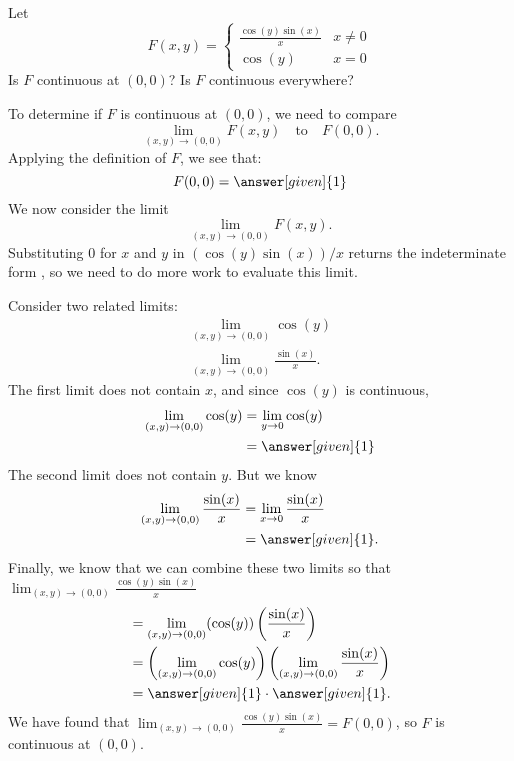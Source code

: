\documentclass{ximera}
\newcommand{\point}[1]{\left(#1\right)} %
\begin{document}
\begin{example}
  Let
  \[
  F(x,y) = \begin{cases}
    \frac{\cos(y)\sin(x)}{x} & x\neq 0 \\
    \cos(y) & x=0
  \end{cases}
  \]
  Is $F$ continuous at $(0,0)$? Is $F$ continuous everywhere?
  \begin{explanation}
    To determine if $F$ is continuous at $(0,0)$, we need to compare
    \[
    \lim_{\point{x,y}\to\point{0,0}} F(x,y)\quad\text{to}\quad F(0,0).
    \]
    Applying the definition of $F$, we see that:
    \[
    F(0,0) = \answer[given]{1}
    \]
    We now consider the limit
    \[
    \lim_{\point{x,y}\to\point{0,0}}F(x,y).
    \]
    Substituting $0$ for $x$ and $y$ in $(\cos(y)\sin(x))/x$ returns the
    indeterminate form \zeroOverZero, so we need to do more work to
    evaluate this limit.
    
    Consider two related limits:
    \begin{align*}
      \lim_{\point{x,y}\to\point{0,0}} \cos(y)\\
      \lim_{\point{x,y}\to\point{0,0}} \frac{\sin(x)}{x}.
    \end{align*}
    The first limit does not contain $x$, and since $\cos(y)$ is
    continuous,
    \begin{align*}
    \lim_{\point{x,y}\to\point{0,0}} \cos(y) &=\lim_{y\to 0} \cos(y) \\
    &=\answer[given]{1}
    \end{align*}
    The second limit does not contain $y$. But we know
    \begin{align*}
      \lim_{\point{x,y}\to\point{0,0}} \frac{\sin(x)}{x} &= \lim_{x\to 0} \frac{\sin(x)}{x} \\
      &= \answer[given]{1}.
    \end{align*}
    Finally, we know that we can combine these two limits so that 
    $\lim_{\point{x,y}\to\point{0,0}} \frac{\cos(y)\sin(x)}{x}$
    \begin{align*}
      &= \lim_{\point{x,y}\to\point{0,0}} (\cos(y))\left(\frac{\sin(x)}{x}\right) \\ 
      &=\left(\lim_{\point{x,y}\to\point{0,0}} \cos(y)\right)\left(\lim_{\point{x,y}\to\point{0,0}} \frac{\sin(x)}{x}\right) \\
            &=\answer[given]{1}\cdot \answer[given]{1}.
    \end{align*}
    We have found that $\lim_{\point{x,y}\to\point{0,0}} \frac{\cos(y)\sin(x)}{x} =
    F(0,0)$, so $F$ is continuous at $(0,0)$.


\end{explanation}
\end{example}
\end{document}
